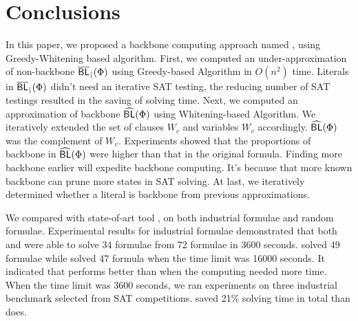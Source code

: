 \section{Conclusions}\label{sec:conc}



In this paper, we proposed a backbone computing approach named \tool, using Greedy-Whitening based algorithm.
First, we computed an under-approximation of non-backbone ${\sf \overline{BL}_\downharpoonright}(\Phi)$ using Greedy-based Algorithm in $O(n^2)$ time. Literals in ${\sf \overline{BL}_\downharpoonright}(\Phi)$ didn't need an iterative SAT testing, the reducing number of SAT testings resulted in the saving of solving time.
Next, we computed an approximation of backbone ${\sf \widehat{BL}}(\Phi)$ using Whitening-based Algorithm. We iteratively extended the set of clauses $W_c$ and variables $W_v$ accordingly. ${\sf \widehat{BL}}(\Phi)$ was the complement of $W_v$. Experiments showed that the proportions of backbone in ${\sf \widehat{BL}}(\Phi)$ were higher than that in the original formula. Finding more backbone earlier will expedite backbone computing. It's because that more known backbone can prune more states in SAT solving.
At last, we iteratively determined whether a literal is backbone from previous approximations.

We compared \tool with state-of-art tool \minibones, on both industrial formulae and random formulae.
Experimental results for industrial formulae demonstrated that both \tool and \minibones were able to solve 34 formulae from 72 formulae in 3600 seconds.
\tool solved 49 formulae while \minibones solved 47 formula when the time limit was 16000 seconds.
It indicated that \tool performs better than \minibones when the computing needed more time.
When the time limit was 3600 seconds, we ran experiments on three industrial benchmark selected from SAT competitions. \tool saved 21\% solving time in total than \minibones does.

